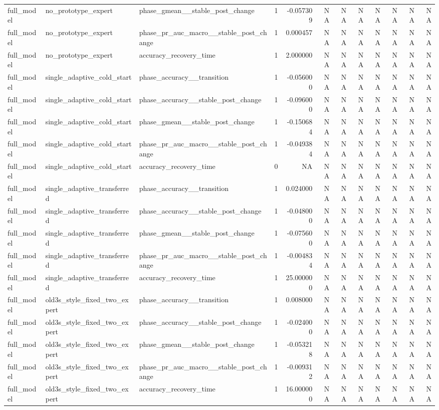 \begin{tabular}{lllrrrrrrrrr}
full\_model & no\_prototype\_expert & phase\_gmean\_\_stable\_post\_change & 1 & -0.057309 & NA & NA & NA & NA & NA & NA & NA \\
full\_model & no\_prototype\_expert & phase\_pr\_auc\_macro\_\_stable\_post\_change & 1 & 0.000457 & NA & NA & NA & NA & NA & NA & NA \\
full\_model & no\_prototype\_expert & accuracy\_recovery\_time & 1 & 2.000000 & NA & NA & NA & NA & NA & NA & NA \\
full\_model & single\_adaptive\_cold\_start & phase\_accuracy\_\_transition & 1 & -0.056000 & NA & NA & NA & NA & NA & NA & NA \\
full\_model & single\_adaptive\_cold\_start & phase\_accuracy\_\_stable\_post\_change & 1 & -0.096000 & NA & NA & NA & NA & NA & NA & NA \\
full\_model & single\_adaptive\_cold\_start & phase\_gmean\_\_stable\_post\_change & 1 & -0.150684 & NA & NA & NA & NA & NA & NA & NA \\
full\_model & single\_adaptive\_cold\_start & phase\_pr\_auc\_macro\_\_stable\_post\_change & 1 & -0.049384 & NA & NA & NA & NA & NA & NA & NA \\
full\_model & single\_adaptive\_cold\_start & accuracy\_recovery\_time & 0 & NA & NA & NA & NA & NA & NA & NA & NA \\
full\_model & single\_adaptive\_transferred & phase\_accuracy\_\_transition & 1 & 0.024000 & NA & NA & NA & NA & NA & NA & NA \\
full\_model & single\_adaptive\_transferred & phase\_accuracy\_\_stable\_post\_change & 1 & -0.048000 & NA & NA & NA & NA & NA & NA & NA \\
full\_model & single\_adaptive\_transferred & phase\_gmean\_\_stable\_post\_change & 1 & -0.075600 & NA & NA & NA & NA & NA & NA & NA \\
full\_model & single\_adaptive\_transferred & phase\_pr\_auc\_macro\_\_stable\_post\_change & 1 & -0.004834 & NA & NA & NA & NA & NA & NA & NA \\
full\_model & single\_adaptive\_transferred & accuracy\_recovery\_time & 1 & 25.000000 & NA & NA & NA & NA & NA & NA & NA \\
full\_model & old3s\_style\_fixed\_two\_expert & phase\_accuracy\_\_transition & 1 & 0.008000 & NA & NA & NA & NA & NA & NA & NA \\
full\_model & old3s\_style\_fixed\_two\_expert & phase\_accuracy\_\_stable\_post\_change & 1 & -0.024000 & NA & NA & NA & NA & NA & NA & NA \\
full\_model & old3s\_style\_fixed\_two\_expert & phase\_gmean\_\_stable\_post\_change & 1 & -0.053218 & NA & NA & NA & NA & NA & NA & NA \\
full\_model & old3s\_style\_fixed\_two\_expert & phase\_pr\_auc\_macro\_\_stable\_post\_change & 1 & -0.009312 & NA & NA & NA & NA & NA & NA & NA \\
full\_model & old3s\_style\_fixed\_two\_expert & accuracy\_recovery\_time & 1 & 16.000000 & NA & NA & NA & NA & NA & NA & NA \\
\bottomrule
\end{tabular}
